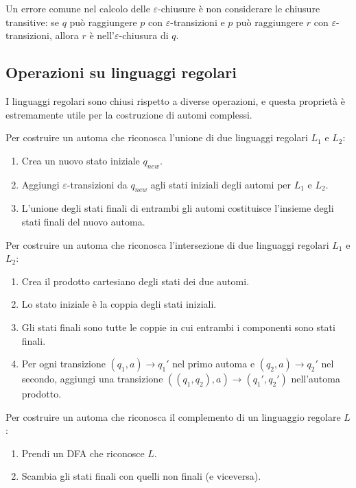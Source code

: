 \documentclass[12pt,a4paper]{article}
\begin{document}
\begin{errorecomune}
Un errore comune nel calcolo delle $\varepsilon$-chiusure è non considerare le chiusure transitive: se $q$ può raggiungere $p$ con $\varepsilon$-transizioni e $p$ può raggiungere $r$ con $\varepsilon$-transizioni, allora $r$ è nell'$\varepsilon$-chiusura di $q$.
\end{errorecomune}

\subsection{Operazioni su linguaggi regolari}

I linguaggi regolari sono chiusi rispetto a diverse operazioni, e questa proprietà è estremamente utile per la costruzione di automi complessi.

\begin{risoluzione}
Per costruire un automa che riconosca l'unione di due linguaggi regolari $L_1$ e $L_2$:

\begin{enumerate}
  \item Crea un nuovo stato iniziale $q_{new}$.
  \item Aggiungi $\varepsilon$-transizioni da $q_{new}$ agli stati iniziali degli automi per $L_1$ e $L_2$.
  \item L'unione degli stati finali di entrambi gli automi costituisce l'insieme degli stati finali del nuovo automa.
\end{enumerate}

Per costruire un automa che riconosca l'intersezione di due linguaggi regolari $L_1$ e $L_2$:

\begin{enumerate}
  \item Crea il prodotto cartesiano degli stati dei due automi.
  \item Lo stato iniziale è la coppia degli stati iniziali.
  \item Gli stati finali sono tutte le coppie in cui entrambi i componenti sono stati finali.
  \item Per ogni transizione $(q_1, a) \to q_1'$ nel primo automa e $(q_2, a) \to q_2'$ nel secondo, aggiungi una transizione $((q_1, q_2), a) \to (q_1', q_2')$ nell'automa prodotto.
\end{enumerate}

Per costruire un automa che riconosca il complemento di un linguaggio regolare $L$:

\begin{enumerate}
  \item Prendi un DFA che riconosce $L$.
  \item Scambia gli stati finali con quelli non finali (e viceversa).
\end{enumerate}
\end{risoluzione}
\end{document}
